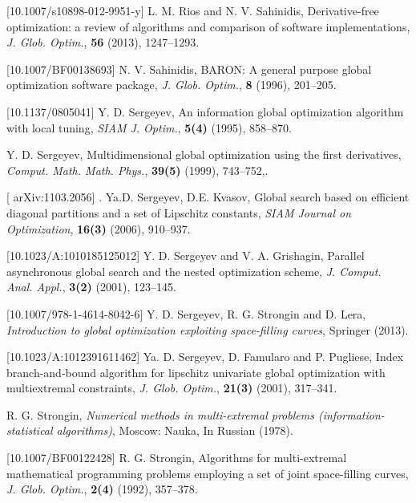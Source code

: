 \documentclass{aims}
\theoremstyle{definition}
\begin{document}
\begin{thebibliography}{10}
[10.1007/s10898-012-9951-y]
\newblock L. M. Rios and N. V. Sahinidis,
\newblock Derivative-free optimization: a review of algorithms and comparison of software implementations,
\newblock \emph{J. Glob. Optim.}, \textbf{56} (2013), 1247--1293.

[10.1007/BF00138693]
\newblock N. V. Sahinidis,
\newblock BARON: A general purpose global optimization software package,
\newblock \emph{J. Glob. Optim.}, \textbf{8} (1996), 201--205.

[10.1137/0805041]
\newblock Y. D. Sergeyev,
\newblock An information global optimization algorithm with local tuning,
\newblock \emph{SIAM J. Optim.}, \textbf{5(4)} (1995), 858--870.

\newblock Y. D. Sergeyev,
\newblock Multidimensional global optimization using the first derivatives,
\newblock \emph{Comput. Math. Math. Phys.}, \textbf{39(5)} (1999), 743--752,.

[	arXiv:1103.2056]
. Ya.D. Sergeyev, D.E. Kvasov,
\newblock Global search based on efficient diagonal partitions and a set of Lipschitz constants,
\newblock \emph{SIAM Journal on Optimization}, \textbf{16(3)} (2006), 910--937.

[10.1023/A:1010185125012]
\newblock Y. D. Sergeyev and V. A. Grishagin,
\newblock Parallel asynchronous global search and the nested optimization scheme,
\newblock \emph{J. Comput. Anal. Appl.}, \textbf{3(2)} (2001), 123--145.

[10.1007/978-1-4614-8042-6]
\newblock Y. D. Sergeyev, R. G. Strongin and D. Lera,
\newblock \emph{Introduction to global optimization exploiting space-filling curves},
\newblock Springer (2013).

[10.1023/A:1012391611462]
\newblock Ya. D. Sergeyev, D. Famularo and P. Pugliese,
\newblock Index branch-and-bound algorithm for lipschitz univariate global optimization with multiextremal constraints,
\newblock \emph{J. Glob. Optim.}, \textbf{21(3)} (2001), 317--341.

\newblock R. G. Strongin,
\newblock \emph{Numerical methods in multi-extremal problems (information-statistical algorithms)},
\newblock Moscow: Nauka, In Russian (1978).

[10.1007/BF00122428]
\newblock R. G. Strongin,
\newblock Algorithms for multi-extremal mathematical programming problems employing a set of joint space-filling curves,
\newblock \emph{J. Glob. Optim.}, \textbf{2(4)} (1992), 357--378.


\end{thebibliography}
\end{document}
